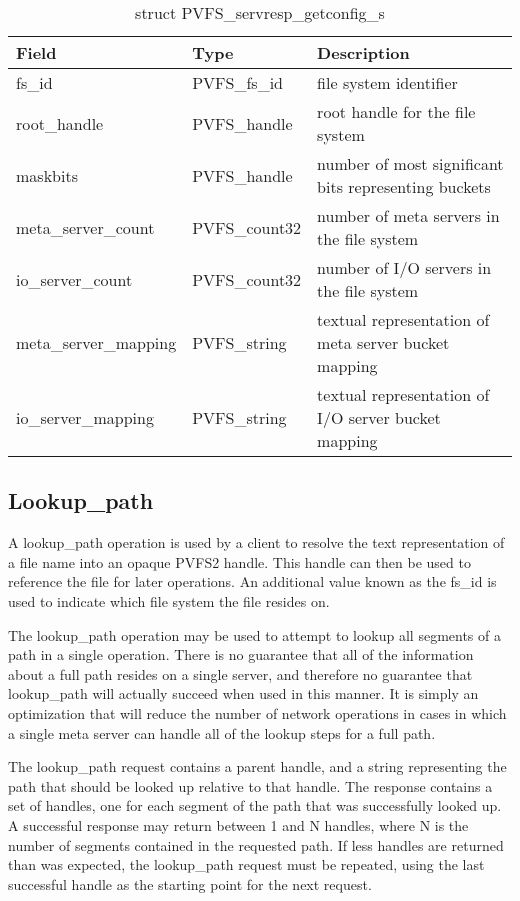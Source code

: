 \documentclass[11pt, letterpaper]{article} %
\begin{document}
\begin{table}[H]
\begin{tabular}{|l|l|l|}
\hline
Field & Type & Description \\
\hline
fs\_id & PVFS\_fs\_id & file system identifier\\
\hline
root\_handle & PVFS\_handle & root handle for the file system\\
\hline
maskbits & PVFS\_handle & number of most significant bits representing buckets\\
\hline
meta\_server\_count & PVFS\_count32 & number of meta servers in the file
system\\
\hline
io\_server\_count & PVFS\_count32 & number of I/O servers in the file
system\\
\hline
meta\_server\_mapping & PVFS\_string & textual representation of
meta server bucket mapping\\
\hline
io\_server\_mapping & PVFS\_string & textual representation of
I/O server bucket mapping\\
\hline
\end{tabular}
\caption{struct PVFS\_servresp\_getconfig\_s
\label{tab:respgetconfig}}
\end{table}


\subsection{Lookup\_path}

A lookup\_path operation is used by a client to resolve the text
representation of a file name into an opaque PVFS2 handle.  This handle
can then be used to reference the file for later operations.  An
additional value known as the fs\_id is
used to indicate which file system the file resides on.

The lookup\_path operation may be used to attempt to lookup
all segments of a path in a single operation.  There is no
guarantee that all of the information about a full path resides on a
single server, and therefore no guarantee that lookup\_path will
actually succeed when used in this manner.  It is simply an optimization that will reduce
the number of network operations in cases in which a single meta server
can handle all of the lookup steps for a full path.  

The lookup\_path request contains a parent handle, and a string
representing the path that should be looked up relative to that
handle.  The response contains a set of handles, one for each
segment of the path that was successfully looked up.  A successful
response may return between 1 and N handles, where N is the number
of segments contained in the requested path.  If less handles are
returned than was expected, the lookup\_path request must be
repeated, using the last successful handle as the starting point
for the next request.
\end{document}
